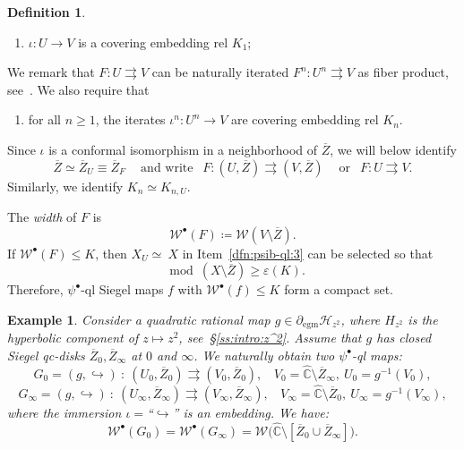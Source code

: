 \documentclass[11pt, reqno]{amsart}
\numberwithin{equation}{section}
\theoremstyle{plain}
\theoremstyle{theorem}
\newtheorem{example}[theorem]{Example}
\theoremstyle{plain}
\theoremstyle{definition}
\newtheorem{defn}[theorem]{Definition}
\numberwithin{figure}{section}
\newcommand{\wC}{\widehat{\mathbb{C}}}
\renewcommand{\sp}{{\ \ }}
\newcommand{\Width}{{\mathcal W}}
\newcommand{\egm}{{\operatorname{egm}}}
\begin{document}
\begin{defn}
\begin{enumerate}[label=\text{(\Roman*)},font=\normalfont,leftmargin=*,start=4]
\item \label{dfn:psib-ql:5} $\iota\colon U\to V$ is a covering embedding rel $K_1$;
\end{enumerate}


We remark that $F\colon U\rightrightarrows V$ can be naturally iterated $F^n\colon U^n\rightrightarrows V$ as fiber product, see~\cite[\S 2]{DLL25}. We also require that
\begin{enumerate}[label=\text{(\Roman*)},font=\normalfont,leftmargin=*,start=6]
\item \label{dfn:psib-ql:6} for all $n\ge 1$, the iterates $\iota^n\colon U^n \to V$ are covering embedding rel $K_n$.
\end{enumerate}
\end{defn} 
 
 
 
Since $\iota$ is a conformal isomorphism in a neighborhood of $\overline Z$, we will below identify 
\[\overline Z\simeq \overline Z_U\equiv \overline Z_F\sp\sp \text{ and write }\sp F\colon ( U, \overline Z)  \rightrightarrows (V, \overline Z) \sp\sp\text{ or }\sp F\colon U \rightrightarrows V.\]
Similarly, we identify $K_{n}\simeq K_{n,U}$.  
  
  
  
  

The \emph{width} of $F$ is 
\[\Width^\bullet(F)\coloneqq \Width(V\setminus \overline Z).\]
 If $\Width^\bullet(F)\le K$, then $X_U\simeq ~X$ in Item~\ref{dfn:psib-ql:3} can be selected so that 
\begin{equation}
    \label{eq:compt of psi maps}\mod(X\setminus \overline Z)\ge \varepsilon(K).
 \end{equation} 
Therefore, $\psi^\bullet$-ql Siegel maps $f$ with $\Width^\bullet(f)\le K$ form a compact set.






\begin{example} Consider a quadratic rational map $g\in \partial_\egm\mathcal{H}_{z^2}$, where $H_{z^2}$ is the hyperbolic component of $z\mapsto z^2$, see~\S\ref{ss:intro:z^2}. Assume that $g$ has closed Siegel qc-disks $\overline Z_0, \overline Z_\infty$ at $0$ and $\infty$. We naturally obtain two $\psi^\bullet$-ql maps:
\[G_0= (g, \hookrightarrow )\  \colon\  (U_0, \overline Z_0)\rightrightarrows (V_0,  \overline Z_0), \sp\sp V_0=\wC \setminus \overline Z_\infty, \ U_0=g^{-1}(V_0),\]
\[G_\infty= (g, \hookrightarrow )\  \colon\  (U_\infty, \overline Z_\infty)\rightrightarrows (V_\infty,  \overline Z_\infty), \sp\sp V_\infty=\wC \setminus \overline Z_0, \ U_\infty=g^{-1}(V_\infty),\]
where the immersion $\iota=$``$\hookrightarrow$'' is an embedding. We have:
\[\Width^\bullet(G_0) =\Width^\bullet(G_\infty)=\Width\big(\wC\setminus [\overline Z_0\cup \overline Z_\infty]\big).\]

\end{example}
\end{document}
